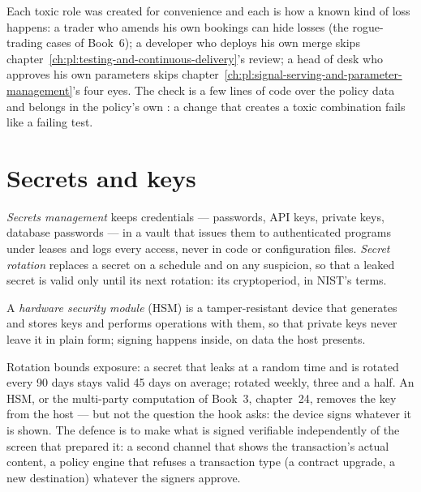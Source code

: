Each toxic role was created for convenience and each is how a known kind of loss happens: a trader who amends his own bookings can hide losses
(the rogue-trading cases of Book~6); a developer who deploys his own merge skips chapter~\ref{ch:pl:testing-and-continuous-delivery}'s review;
a head of desk who approves his own parameters skips chapter~\ref{ch:pl:signal-serving-and-parameter-management}'s four eyes. The check is a
few lines of code over the policy data and belongs in the policy's own : a change that creates a toxic combination fails
like a failing test.

\section{Secrets and keys}

\begin{definition}\label{def:pl:security:secrets}
\emph{Secrets management} keeps credentials --- passwords, API keys, private keys, database passwords --- in a
vault that issues them to authenticated programs under leases and logs every access, never in code or configuration files. \emph{Secret
rotation} replaces a secret on a schedule and on any suspicion, so that a leaked secret is valid only until its next
rotation: its cryptoperiod, in NIST's terms.
\end{definition}

\begin{definition}\label{def:pl:security:hsm}
A \emph{hardware security module} (HSM) is a tamper-resistant device that generates and stores keys and
performs operations with them, so that private keys never leave it in plain form; signing happens inside, on data the host presents.
\end{definition}

Rotation bounds exposure: a secret that leaks at a random time and is rotated every 90 days stays valid 45 days on average; rotated weekly,
three and a half. An HSM, or the multi-party computation of Book~3, chapter~24, removes the key from the host --- but not the question the hook
asks: the device signs whatever it is shown. The defence is to make what is signed verifiable independently of the screen that prepared it:
a second channel that shows the transaction's actual content, a policy engine that refuses a transaction type (a contract upgrade, a new
destination) whatever the signers approve.

